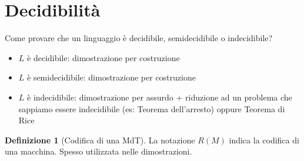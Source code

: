 \documentclass{article}  %
\theoremstyle{definition}
\newtheorem{definition}{Definizione}[section]
\begin{document}
\section{Decidibilità}
\newline \newline
Come provare che un linguaggio è decidibile, semidecidibile o indecidibile?
\begin{itemize}
  \item $L$ è decidibile: dimostrazione per costruzione
  \item $L$ è semidecidibile: dimostrazione per costruzione
  \item $L$ è indecidibile: dimostrazione per assurdo + riduzione ad un problema che sappiamo essere indecidibile (es: Teorema dell'arresto) oppure Teorema di Rice
\end{itemize}
\begin{definition}[Codifica di una MdT] La notazione $R(M)$ indica la codifica di una macchina. Spesso utilizzata nelle dimostrazioni.
\end{definition}
\end{document}
